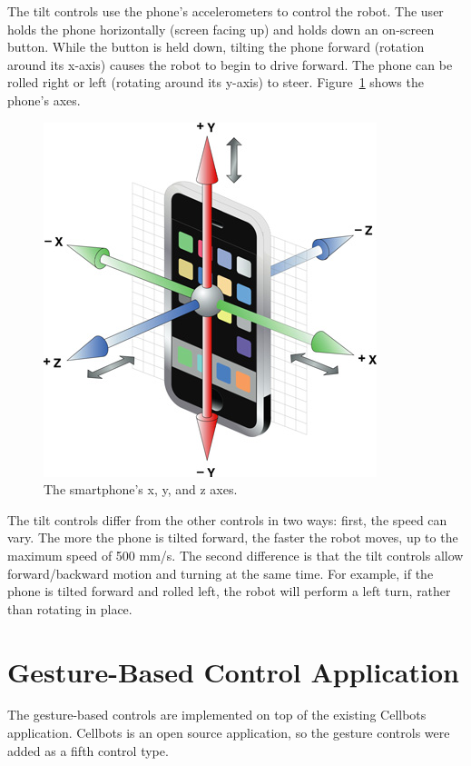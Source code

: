 \documentclass[12pt, letterpaper]{report}
\begin{document}
The tilt controls use the phone's accelerometers to control the robot. The user holds the phone horizontally (screen facing up) and holds down an on-screen button. While the button is held down, tilting the phone forward (rotation around its x-axis) causes the robot to begin to drive forward. The phone can be rolled right or left (rotating around its y-axis) to steer. Figure~\ref{acceleration_axes} shows the phone's axes.

\begin{figure}[h]
	\centering
	\includegraphics[scale=0.5]{images/acceleration_axes}
	\caption{The smartphone's x, y, and z axes.}
	\label{acceleration_axes} 
\end{figure}

The tilt controls differ from the other controls in two ways: first, the speed can vary. The more the phone is tilted forward, the faster the robot moves, up to the maximum speed of 500 mm/s.  The second difference is that the tilt controls allow forward/backward motion and turning at the same time. For example, if the phone is tilted forward and rolled left, the robot will perform a left turn, rather than rotating in place.

\section{Gesture-Based Control Application}
The gesture-based controls are implemented on top of the existing Cellbots application. Cellbots is an open source application, so the gesture controls were added as a fifth control type. 
\end{document}
